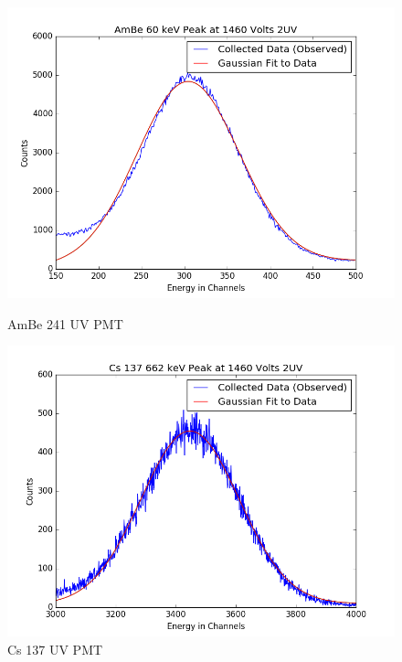\documentclass{article}
\begin{document}
\begin{figure}[H]
  \centering
  \begin{minipage}[b]{0.4\textwidth}
    \includegraphics[width=\textwidth]{2UVAmBefit.png}
    \caption{AmBe 241 UV PMT}
  \end{minipage}
  \hfill
  \begin{minipage}[b]{0.4\textwidth}
    \includegraphics[width=\textwidth]{2UVCsfit.png}
    \caption{Cs 137 UV PMT}
  \end{minipage}
\end{figure}
\end{document}
